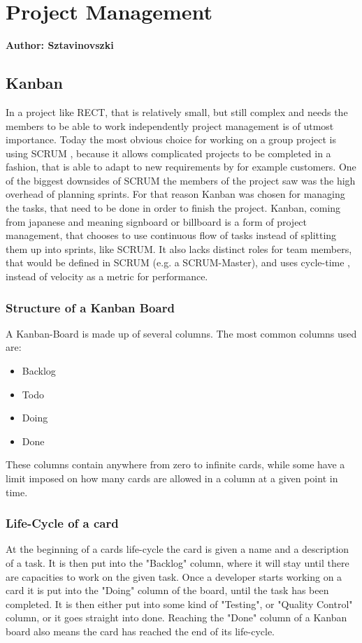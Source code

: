 \section{Project Management}
\textbf{Author: Sztavinovszki}

\subsection{Kanban}
In a project like RECT, that is relatively small, but still complex and needs the members to be able to work independently project management is of utmost importance. Today the most
obvious choice for working on a group project is using SCRUM \cite{what-is-scrum}, because it allows complicated projects to be completed in a fashion, 
that is able to adapt to new requirements by for example customers. One of the biggest downsides of SCRUM the members of the project saw was the high overhead of planning sprints. 
For that reason Kanban was chosen for managing the tasks, that need to be done in order to finish the project. Kanban, coming from japanese and meaning signboard or billboard 
\cite{what-is-kanban} is a form of project management, that chooses to use continuous flow of tasks instead of splitting them up into sprints, like SCRUM. 
It also lacks distinct roles for team members, that would be defined in SCRUM (e.g. a SCRUM-Master), and uses cycle-time \cite{cycle-time-lead-time},
instead of velocity as a metric for performance. 

\subsubsection{Structure of a Kanban Board}
A Kanban-Board is made up of several columns. The most common columns used are:
\begin{itemize}
\item Backlog
\item Todo
\item Doing
\item Done
\end{itemize}
These columns contain anywhere from zero to infinite cards, while some have a limit imposed on how many cards are allowed in a column at a given point in time.

\subsubsection{Life-Cycle of a card}
At the beginning of a cards life-cycle the card is given a name and a description of a task. It is then put into the "Backlog" column, where it will stay until there are capacities
to work on the given task. Once a developer starts working on a card it is put into the "Doing" column of the board, until the task has been completed. It is then either put into
some kind of "Testing", or "Quality Control" column, or it goes straight into done. Reaching the "Done" column of a Kanban board also means the card has reached the end of its
life-cycle.


